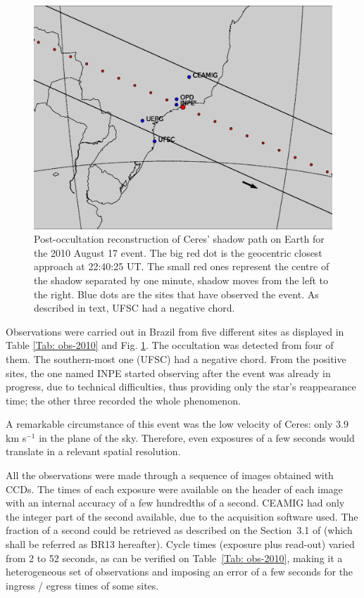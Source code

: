 \documentclass[useAMS,usenatbib]{mn2e}
\begin{document}
\begin{figure}
\includegraphics[scale=0.42]{figures/Ceres_2010.eps} 
\caption{Post-occultation reconstruction of Ceres' shadow path on Earth for the 2010 August 17 event. The big red dot is the geocentric closest approach at 22:40:25 UT. The small red ones represent the centre of the shadow separated by one minute, shadow moves from the left to the right. Blue dots are the sites that have observed the event. As described in text, UFSC had a negative chord.
\label{Fig: Ceres-2010-map}}
\end{figure}

Observations were carried out in Brazil from five different sites as displayed in Table \ref{Tab: obs-2010} and Fig. \ref{Fig: Ceres-2010-map}. The occultation was detected from four of them. The southern-most one (UFSC) had a negative chord. From the positive sites, the one named INPE started observing after the event was already in progress, due to technical difficulties, thus providing only the star's reappearance time; the other three recorded the whole phenomenon.

A remarkable circumstance of this event was the low velocity of Ceres: only 3.9 km s$^{-1}$ in the plane of the sky. Therefore, even exposures of a few seconds would translate in a relevant spatial resolution.

All the observations were made through a sequence of images obtained with CCDs. The times of each exposure were available on the header of each image with an internal accuracy of a few hundredths of a second. CEAMIG had only the integer part of the second available, due to the acquisition software used. The fraction of a second could be retrieved as described on the Section~3.1 of \cite{BragaRibas2013}  (which shall be referred as BR13 hereafter). Cycle times (exposure plus read-out) varied from 2 to 52 seconds, as can be verified on Table~\ref{Tab: obs-2010}, making it a heterogeneous set of observations and imposing an error of a few seconds for the ingress / egress times of some sites.
\end{document}
